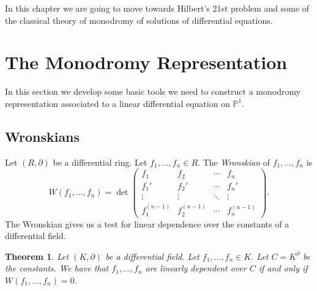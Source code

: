 \documentclass[12pt]{book}
\numberwithin{equation}{section}
\newtheorem{theorem}{Theorem}[subsection]
\theoremstyle{definition}
\theoremstyle{remark}
\newcommand{\PP}{\mathbb{P}}
\begin{document}
In this chapter we are going to move towards Hilbert's 21st problem and some of the classical theory of monodromy of solutions of differential equations.


\section{The Monodromy Representation}
In this section we develop some basic tools we need to construct a monodromy representation associated to a linear differential equation on $\PP^1$.

\subsection{Wronskians}

Let $(R,\partial)$ be a differential ring. 
Let $f_1,\ldots,f_n\in R$. 
The \emph{Wronskian} of $f_1,\ldots,f_n$ is 
 $$ W(f_1,\ldots,f_n) = \det \begin{pmatrix}
 f_1 & f_2 & \cdots & f_n \\
 f_1' & f_2' & \cdots & f_n' \\
 \vdots & \vdots & \ddots & \vdots \\
 f_1^{(n-1)} & f_2^{(n-1)} & \cdots & f_n^{(n-1)}
 \end{pmatrix}.$$
The Wronskian gives us a test for linear dependence over the constants of a differential field. 
\begin{theorem}
	Let $(K,\partial)$ be a differential field. 
	Let $f_1,\ldots,f_n \in K$. 
	Let $C = K^{\partial}$ be the constants. 
	We have that $f_1,\ldots,f_n$ are linearly dependent over $C$ if and only if $W(f_1,\ldots,f_n)=0$. 
\end{theorem}
\end{document}
